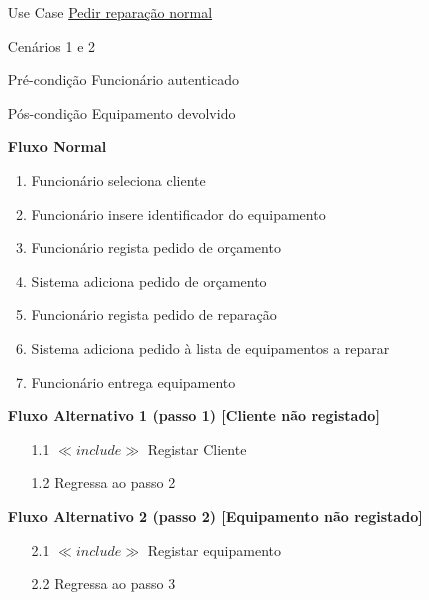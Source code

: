 \documentclass[../relatorio.tex]{subfiles}
\begin{document}
\begin{itemize}
	\item[Use Case] {\underline{Pedir reparação normal}}
	\item[Cenários] {1 e 2}
	\item[Pré-condição] {Funcionário autenticado}
	\item[Pós-condição] {Equipamento devolvido}
	      \begin{flushleft}
		      \textbf{Fluxo Normal}
	      \end{flushleft}
	      \begin{enumerate}
		      \item Funcionário seleciona cliente
		      \item Funcionário insere identificador do equipamento
		      \item Funcionário regista pedido de orçamento
		      \item Sistema adiciona pedido de orçamento
		      \item Funcionário regista pedido de reparação
		      \item Sistema adiciona pedido à lista de equipamentos a reparar
		      \item Funcionário entrega equipamento
	      \end{enumerate}
	      \begin{flushleft}
		      \textbf{Fluxo Alternativo 1 (passo 1) [Cliente não registado]}
	      \end{flushleft}

	      \begin{itemize}
		      \item[1.1]{$\ll include \gg$ Registar Cliente}
		      \item[1.2] {Regressa ao passo 2}
	      \end{itemize}
	      \begin{flushleft}
		      \textbf{Fluxo Alternativo 2 (passo 2) [Equipamento não registado]}
	      \end{flushleft}
	      \begin{itemize}
		      \item[2.1] $\ll include \gg$ Registar equipamento
		      \item[2.2] Regressa ao passo 3
	      \end{itemize}


\end{itemize}
\end{document}
